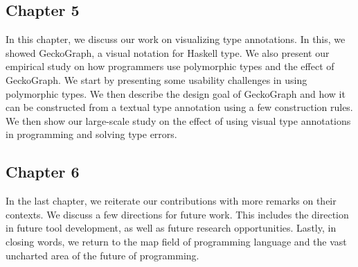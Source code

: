 \subsection{Chapter 5}

In this chapter, we discuss our work on visualizing type annotations. In this, we showed GeckoGraph, a visual notation for Haskell type. We also present our empirical study on how programmers use polymorphic types and the effect of GeckoGraph. We start by presenting some usability challenges in using polymorphic types. We then describe the design goal of GeckoGraph and how it can be constructed from a textual type annotation using a few construction rules. We then show our large-scale study on the effect of using visual type annotations in programming and solving type errors. 


\subsection{Chapter 6}

In the last chapter, we reiterate our contributions with more remarks on their contexts. We discuss a few directions for future work. This includes the direction in future tool development, as well as future research opportunities. Lastly, in closing words, we return to the map field of programming language and the vast uncharted area of the future of programming. 